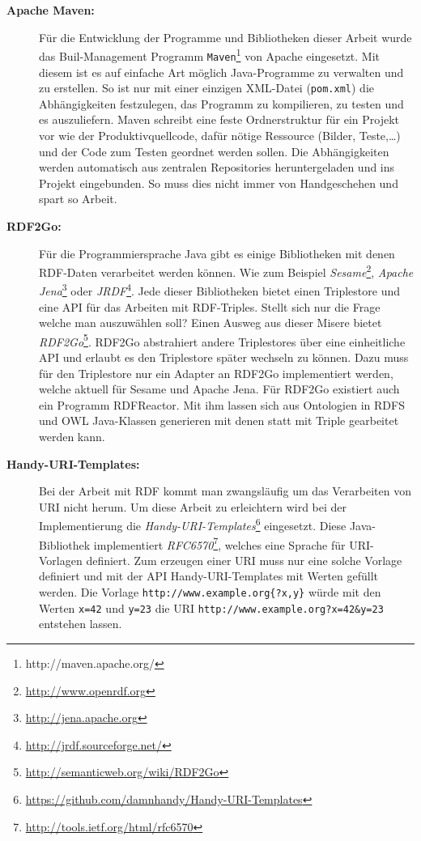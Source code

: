\begin{description}
    \item[\textbf{Apache Maven:}] Für die Entwicklung der Programme und Bibliotheken dieser Arbeit wurde das Buil-Management Programm \texttt{Maven}\footnote{http://maven.apache.org/} von Apache eingesetzt. Mit diesem ist es auf einfache Art möglich Java-Programme zu verwalten und zu erstellen. So ist nur mit einer einzigen XML-Datei (\texttt{pom.xml}) die Abhängigkeiten festzulegen, das Programm zu kompilieren, zu testen und es auszuliefern. Maven schreibt eine feste Ordnerstruktur für ein Projekt vor wie der Produktivquellcode, dafür nötige Ressource (Bilder, Teste,\dots) und der Code zum Testen geordnet werden sollen. Die Abhängigkeiten werden automatisch aus zentralen Repositories heruntergeladen und ins Projekt eingebunden. So muss dies nicht immer von Handgeschehen und spart so Arbeit.

    \item[\textbf{RDF2Go:}] Für die Programmiersprache Java gibt es einige Bibliotheken mit denen RDF-Daten verarbeitet werden können. Wie zum Beispiel \emph{Sesame}\footnote{\url{http://www.openrdf.org}}, \emph{Apache Jena}\footnote{\url{http://jena.apache.org}} oder \emph{JRDF}\footnote{\url{http://jrdf.sourceforge.net/}}. Jede dieser Bibliotheken bietet einen Triplestore und eine API für das Arbeiten mit RDF-Triples. Stellt sich nur die Frage welche man auszuwählen soll? Einen Ausweg aus dieser Misere bietet \emph{RDF2Go}\footnote{\url{http://semanticweb.org/wiki/RDF2Go}}. RDF2Go abstrahiert andere Triplestores über eine einheitliche API und erlaubt es den Triplestore später wechseln zu können. Dazu muss für den Triplestore nur ein Adapter an RDF2Go implementiert werden, welche aktuell für Sesame und Apache Jena. Für RDF2Go existiert auch ein Programm RDFReactor. Mit ihm lassen sich aus Ontologien in RDFS und OWL Java-Klassen generieren mit denen statt mit Triple gearbeitet werden kann. 

    \item[\textbf{Handy-URI-Templates:}] Bei der Arbeit mit RDF kommt man zwangsläufig um das Verarbeiten von URI nicht herum. Um diese Arbeit zu erleichtern wird bei der Implementierung die \emph{Handy-URI-Templates}\footnote{\url{https://github.com/damnhandy/Handy-URI-Templates}} eingesetzt. Diese Java-Bibliothek implementiert \emph{RFC6570}\footnote{\url{http://tools.ietf.org/html/rfc6570}}, welches eine Sprache für URI-Vorlagen definiert. Zum erzeugen einer URI muss nur eine solche Vorlage definiert und mit der API Handy-URI-Templates mit Werten gefüllt werden. Die Vorlage \texttt{http://www.example.org\{?x,y\}} würde mit den Werten \texttt{x=42} und \texttt{y=23} die URI \texttt{http://www.example.org?x=42\&y=23} entstehen lassen.
\end{description}

